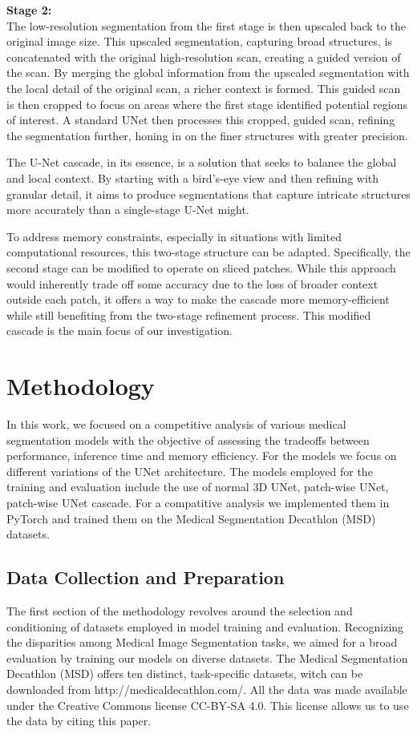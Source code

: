 \noindent\textbf{Stage 2:}\\
The low-resolution segmentation from the first stage is then upscaled back to the original image size. This upscaled segmentation, capturing broad structures,
is concatenated with the original high-resolution scan, creating a guided version of the scan.
By merging the global information from the upscaled segmentation with the local detail of the original scan, a richer context is formed.
This guided scan is then cropped to focus on areas where the first stage identified potential regions of interest.
A standard UNet then processes this cropped, guided scan, refining the segmentation further, honing in on the finer structures with greater precision.

The U-Net cascade, in its essence, is a solution that seeks to balance the global and local context.
By starting with a bird's-eye view and then refining with granular detail,
it aims to produce segmentations that capture intricate structures more accurately than a single-stage U-Net might.

To address memory constraints, especially in situations with limited computational resources, this two-stage structure can be adapted. Specifically,
the second stage can be modified to operate on sliced patches.
While this approach would inherently trade off some accuracy due to the loss of broader context outside each patch,
it offers a way to make the cascade more memory-efficient while still benefiting from the two-stage refinement process.
This modified cascade is the main focus of our investigation.

\chapter{Methodology}
In this work, we focused on a competitive analysis of various medical segmentation models with the objective of assessing the tradeoffs between performance, inference time and memory efficiency.
For the models we focus on different variations of the UNet architecture. The models employed for the training and evaluation include the use of normal 3D UNet, patch-wise UNet,
patch-wise UNet cascade. For a compatitive analysis we implemented them in PyTorch and trained them on the Medical Segmentation Decathlon (MSD) datasets.\\

\section{Data Collection and Preparation}
The first section of the methodology revolves around the selection and conditioning of datasets employed in model training and evaluation.
Recognizing the disparities among Medical Image Segmentation tasks, we aimed for a broad evaluation by training our models on diverse datasets.
The Medical Segmentation Decathlon (MSD) offers ten distinct, task-specific datasets, witch can be downloaded from http://medicaldecathlon.com/.
All the data was made available under the Creative Commons license CC-BY-SA 4.0. This license allows us to use the data by citing this paper.\cite{simpson_large_2019}

